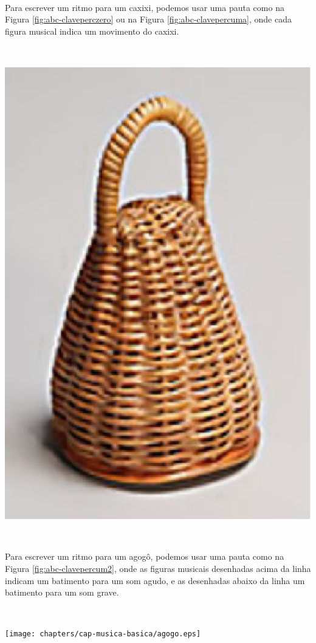 \begin{example} ~

\begin{minipage}{0.745\textwidth}
Para escrever um ritmo para um caxixi, 
podemos usar uma pauta como na Figura \ref{fig:abc-claveperczero} ou na Figura \ref{fig:abc-clavepercuma}, 
onde  cada figura musical indica um movimento do caxixi.
\end{minipage}~~
\begin{minipage}{0.1\textwidth}
\includegraphics[width=\textwidth]{chapters/cap-musica-basica/caxixi.eps}
\end{minipage}
\end{example} 

\begin{example} ~

\begin{minipage}{0.595\textwidth}
Para escrever um ritmo para um agogô, 
podemos usar uma pauta como na Figura \ref{fig:abc-clavepercum2}, 
onde  as figuras musicais desenhadas acima da linha indicam um batimento para um som agudo,
e as desenhadas abaixo da linha um batimento para um som grave.
\end{minipage}~~
\begin{minipage}{0.25\textwidth}
\texttt{[image: chapters/cap-musica-basica/agogo.eps]}
\end{minipage}
\end{example} 

